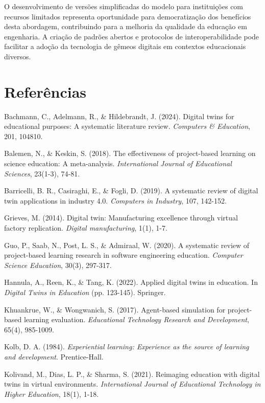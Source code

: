 \documentclass[english, spanish, brazilian]{modelo_dt}
\begin{document}
O desenvolvimento de versões simplificadas do modelo para instituições com
recursos limitados representa oportunidade para democratização dos benefícios
desta abordagem, contribuindo para a melhoria da qualidade da educação em
engenharia\@. A criação de padrões abertos e protocolos de interoperabilidade
pode facilitar a adoção da tecnologia de gêmeos digitais em contextos
educacionais diversos\@.

\section*{Referências}

\noindent
Bachmann, C., Adelmann, R., \& Hildebrandt, J. (2024). Digital twins for educational purposes: A systematic literature review. \textit{Computers \& Education}, 201, 104810.

\noindent
Balemen, N., \& Keskin, S. (2018). The effectiveness of project-based learning on science education: A meta-analysis. \textit{International Journal of Educational Sciences}, 23(1-3), 74-81.

\noindent
Barricelli, B. R., Casiraghi, E., \& Fogli, D. (2019). A systematic review of digital twin applications in industry 4.0. \textit{Computers in Industry}, 107, 142-152.

\noindent
Grieves, M. (2014). Digital twin: Manufacturing excellence through virtual factory replication. \textit{Digital manufacturing}, 1(1), 1-7.

\noindent
Guo, P., Saab, N., Post, L. S., \& Admiraal, W. (2020). A systematic review of project-based learning research in software engineering education. \textit{Computer Science Education}, 30(3), 297-317.

\noindent
Hannula, A., Reen, K., \& Tang, K. (2022). Applied digital twins in education. In \textit{Digital Twins in Education} (pp. 123-145). Springer.

\noindent
Khuankrue, W., \& Wongwanich, S. (2017). Agent-based simulation for project-based learning evaluation. \textit{Educational Technology Research and Development}, 65(4), 985-1009.

\noindent
Kolb, D. A. (1984). \textit{Experiential learning: Experience as the source of learning and development}. Prentice-Hall.

\noindent
Kolivand, M., Dias, L. P., \& Sharma, S. (2021). Reimaging education with digital twins in virtual environments. \textit{International Journal of Educational Technology in Higher Education}, 18(1), 1-18.
\end{document}
